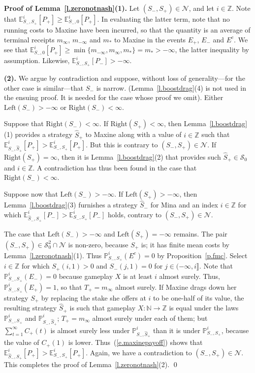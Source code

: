 \documentclass[letterpaper,11pt,oneside,reqno]{amsbook}
\newcommand{\PP}{\ensuremath{\mathbb{P}}}
\newcommand{\N}{\ensuremath{\mathbb{N}}}
\newcommand{\Z}{\ensuremath{\mathbb{Z}}}
\newcommand{\E}[0]{\mathbb{E}}
\numberwithin{figure}{chapter}
\theoremstyle{definition}
\theoremstyle{definition}
\theoremstyle{definition}
\theoremstyle{definition}
\theoremstyle{definition}
\newcommand{\mc}{\mathcal}
\newcommand{\tis}{\mc{S}_0}
\newcommand\pgameplay[3]{\PP^{#3}_{#1,#2}}
\newcommand\egameplay[3]{\E^{#3}_{#1,#2}}
\newcommand{\lef}{\textrm{Left}}
\newcommand{\righ}{\textrm{Right}}
\begin{document}
{\bf Proof of Lemma~\ref{l.zeronotnash}(1).} 
 Let $(S_-,S_+) \in \mc{N}$, and let $i \in \Z$. Note that $
 \egameplay{S_-}{S_+}{i} [P_+] \geq  \egameplay{S_-}{0}{i}  [P_+]$.
 In evaluating the latter term, note that no running costs to Maxine have been incurred, so that the quantity is an average of terminal receipts $m_\infty$, $m_{-\infty}$ and $m_*$ to Maxine in the events $E_+$, $E_-$ and $E^c$. 
 We see that  $\egameplay{S_-}{0}{i}  [P_+] \geq \min \{ m_{-\infty},m_\infty,m_* \} = m_* > -\infty$, the latter inequality by assumption.  Likewise,   $\egameplay{S_-}{S_+}{i}[  P_-] > -\infty$. 
 
 {\bf (2).} We argue by contradiction and suppose, without loss of generality---for the other case is similar---that $S_-$ is narrow.
 (Lemma~\ref{l.boostdrag}(4) is not used in the ensuing proof. It is needed for the case whose proof we omit).
  Either $\lef(S_-) > -\infty$ or $\righ(S_-) < \infty$.
 
 Suppose that $\righ(S_-) < \infty$. If $\righ(S_+) < \infty$, then Lemma~\ref{l.boostdrag}(1) provides a strategy $\hat{S}_+$ to Maxine along with a value of $i \in \Z$ such that
 $\egameplay{S_-}{\hat{S}_+}{i}[P_+] > \egameplay{S_-}{S_+}{i}[P_+]$. But this is contrary to $(S_-,S_+) \in \mc{N}$. If $\righ(S_+) = \infty$, then it is Lemma~\ref{l.boostdrag}(2) that provides such $\hat{S}_+ \in \tis$
 and $i \in \Z$. A contradiction has thus been found in the case that  $\righ(S_-) < \infty$.
 
 Suppose now that  $\lef(S_-) > -\infty$. If $\lef(S_+) > -\infty$, then Lemma~\ref{l.boostdrag}(3) furnishes a strategy $\hat{S}_-$ for Mina and an index $i \in \Z$ 
 for which $\egameplay{\hat{S}_-}{S_+}{i}[P_-] > \egameplay{S_-}{S_+}{i}[P_-]$ holds, contrary to $(S_-,S_+) \in \mc{N}$.
 
 The case that  $\lef(S_-) > -\infty$ and $\lef(S_+) = -\infty$ remains. 
 The pair $(S_-,S_+) \in \tis^2 \cap \mc{N}$ is non-zero, because $S_+$ is; it has finite mean costs by Lemma~\ref{l.zeronotnash}(1).
 Thus $\pgameplay{S_-}{S_+}{i}(E^c) = 0$ by Proposition~\ref{p.fmc}. Select $i \in \Z$ for which $S_+(i,1) > 0$ and $S_-(j,1) = 0$ for $j \in (-\infty, i \rrbracket$. Note that 
  $\pgameplay{S_-}{S_+}{i}(E_-) = 0$ because gameplay $X$ is at least $i$ almost surely. Thus,  $\pgameplay{S_-}{S_+}{i}(E_+) = 1$, so that $T_+ = m_\infty$ almost surely. If Maxine drags down her strategy $S_+$ by replacing the stake she offers at $i$ to be one-half of its value, the resulting strategy $\hat{S}_+$
  is such that gameplay $X:\N \to \Z$ is equal under the laws  $\pgameplay{S_-}{S_+}{i}$ and $\pgameplay{S_-}{\hat{S}_+}{i}$; $T_+ = m_\infty$ almost surely under each of them; but $\sum_{t=1}^\infty C_+(t)$ is almost surely less under $\pgameplay{S_-}{\hat{S}_+}{i}$ than it is under $\pgameplay{S_-}{S_+}{i}$, because the value of $C_+(1)$ is lower. 
  Thus~(\ref{e.maxinepayoff}) shows that
   $\egameplay{\hat{S}_-}{S_+}{i}[P_+] > \egameplay{S_-}{S_+}{i}[P_+]$. 
   Again, we have a contradiction to  $(S_-,S_+) \in \mc{N}$. This completes the proof of Lemma~\ref{l.zeronotnash}(2). \qed
 
\end{document}
